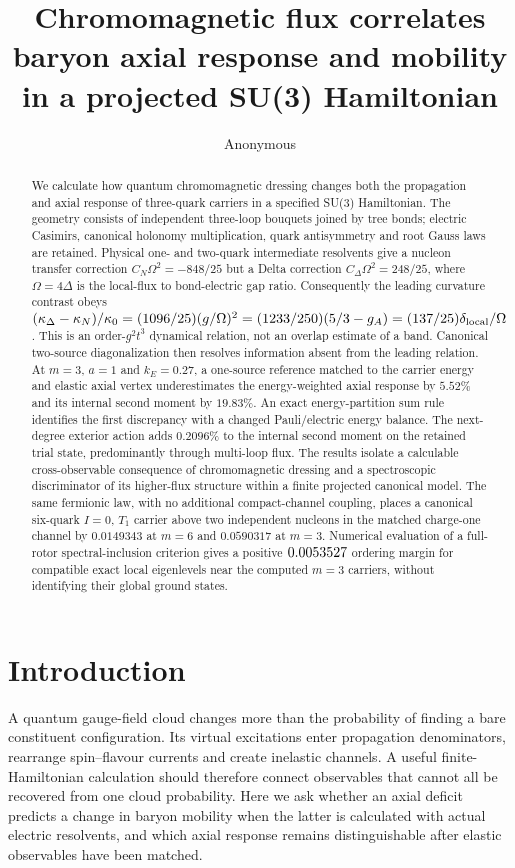 \documentclass[11pt]{article}
\title{Chromomagnetic flux correlates baryon axial response and mobility in a projected SU(3) Hamiltonian}
\author{Anonymous}
\date{}
\begin{document}
\maketitle
\begin{abstract}
We calculate how quantum chromomagnetic dressing changes both the propagation and axial response of three-quark carriers in a specified SU(3) Hamiltonian. The geometry consists of independent three-loop bouquets joined by tree bonds; electric Casimirs, canonical holonomy multiplication, quark antisymmetry and root Gauss laws are retained. Physical one- and two-quark intermediate resolvents give a nucleon transfer correction $C_N\Omega^2=-848/25$ but a Delta correction $C_\Delta\Omega^2=248/25$, where $\Omega=4\Delta$ is the local-flux to bond-electric gap ratio. Consequently the leading curvature contrast obeys $(\kappa_\Delta-\kappa_N)/\kappa_0=(1096/25)(g/\Omega)^2=(1233/250)(5/3-g_A)=(137/25)\delta_{\rm local}/\Omega$. This is an order-$g^2t^3$ dynamical relation, not an overlap estimate of a band. Canonical two-source diagonalization then resolves information absent from the leading relation. At $m=3$, $a=1$ and $k_E=0.27$, a one-source reference matched to the carrier energy and elastic axial vertex underestimates the energy-weighted axial response by $5.52\%$ and its internal second moment by $19.83\%$. An exact energy-partition sum rule identifies the first discrepancy with a changed Pauli/electric energy balance. The next-degree exterior action adds $0.2096\%$ to the internal second moment on the retained trial state, predominantly through multi-loop flux. The results isolate a calculable cross-observable consequence of chromomagnetic dressing and a spectroscopic discriminator of its higher-flux structure within a finite projected canonical model.
The same fermionic law, with no additional compact-channel coupling, places a canonical six-quark $I=0$, $T_1$ carrier above two independent nucleons in the matched charge-one channel by $0.0149343$ at $m=6$ and $0.0590317$ at $m=3$.
Numerical evaluation of a full-rotor spectral-inclusion criterion gives a positive $0.0053527$ ordering margin for compatible exact local eigenlevels near the computed $m=3$ carriers, without identifying their global ground states.
\end{abstract}

\section{Introduction}
A quantum gauge-field cloud changes more than the probability of finding a bare constituent configuration. Its virtual excitations enter propagation denominators, rearrange spin--flavour currents and create inelastic channels. A useful finite-Hamiltonian calculation should therefore connect observables that cannot all be recovered from one cloud probability. Here we ask whether an axial deficit predicts a change in baryon mobility when the latter is calculated with actual electric resolvents, and which axial response remains distinguishable after elastic observables have been matched.
\end{document}
